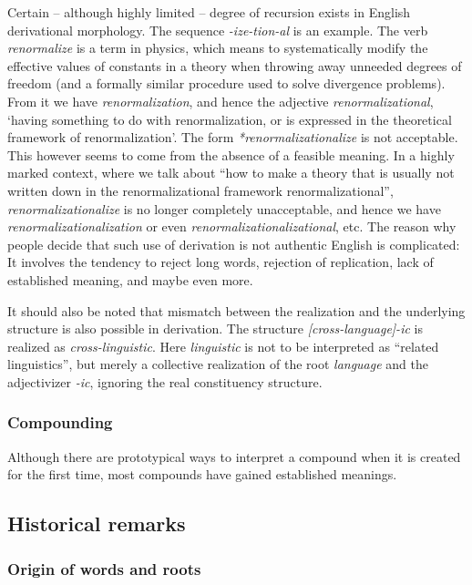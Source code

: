 \documentclass[UTF8, a4paper, oneside, scheme=plain]{ctexrep}
\newcommand{\corpus}[1]{\emph{#1}}
\newcommand{\translate}[1]{`#1'}
\begin{document}
Certain -- although highly limited -- degree of recursion exists in English derivational morphology.
The sequence \corpus{-ize-tion-al} is an example.
The verb \corpus{renormalize} is a term in physics,
which means to systematically modify the effective values of constants in a theory 
when throwing away unneeded degrees of freedom 
(and a formally similar procedure used to solve divergence problems).
From it we have \corpus{renormalization},
and hence the adjective \corpus{renormalizational},
\translate{having something to do with renormalization,
or is expressed in the theoretical framework of renormalization}.
The form \corpus{*renormalizationalize} is not acceptable.
This however seems to come from the absence of a feasible meaning.
In a highly marked context,
where we talk about 
``how to make a theory that is usually not written down in the renormalizational framework
renormalizational'',
\corpus{renormalizationalize} is no longer completely unacceptable,
and hence we have \corpus{renormalizationalization} or even \corpus{renormalizationalizational}, etc.
The reason why people decide that such use of derivation is not authentic English is complicated:
It involves the tendency to reject long words, 
rejection of replication,
lack of established meaning,
and maybe even more.

It should also be noted that mismatch 
between the realization and the underlying structure 
is also possible in derivation.
The structure \corpus{[cross-language]-ic} is realized as 
\corpus{cross-linguistic}.
Here \corpus{linguistic} is not to be interpreted as 
``related linguistics'',
but merely a collective realization of the root \corpus{language} and the adjectivizer \corpus{-ic},
ignoring the real constituency structure.

\subsubsection{Compounding}\label{sec:pos.overview.derivation.compound}

Although there are prototypical ways to interpret a compound
when it is created for the first time,
most compounds have gained established meanings.

\subsection{Historical remarks}

\subsubsection{Origin of words and roots}
\end{document}
